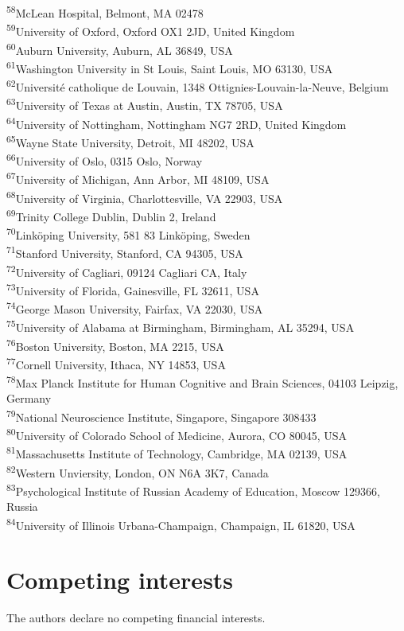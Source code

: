 \documentclass[fleqn,10pt,inline]{wlscirep}
\begin{document}
\textsuperscript{58}McLean Hospital, Belmont, MA 02478\\
\textsuperscript{59}University of Oxford, Oxford OX1 2JD, United Kingdom\\
\textsuperscript{60}Auburn University, Auburn, AL 36849, USA\\
\textsuperscript{61}Washington University in St Louis, Saint Louis, MO 63130, USA\\
\textsuperscript{62}Université catholique de Louvain, 1348 Ottignies-Louvain-la-Neuve, Belgium\\
\textsuperscript{63}University of Texas at Austin, Austin, TX 78705, USA\\
\textsuperscript{64}University of Nottingham, Nottingham NG7 2RD, United Kingdom\\
\textsuperscript{65}Wayne State University, Detroit, MI 48202, USA\\
\textsuperscript{66}University of Oslo, 0315 Oslo, Norway\\
\textsuperscript{67}University of Michigan, Ann Arbor, MI 48109, USA\\
\textsuperscript{68}University of Virginia, Charlottesville, VA 22903, USA\\
\textsuperscript{69}Trinity College Dublin, Dublin 2, Ireland\\
\textsuperscript{70}Linköping University, 581 83 Linköping, Sweden\\
\textsuperscript{71}Stanford University, Stanford, CA 94305, USA\\
\textsuperscript{72}University of Cagliari, 09124 Cagliari CA, Italy\\
\textsuperscript{73}University of Florida, Gainesville, FL 32611, USA\\
\textsuperscript{74}George Mason University, Fairfax, VA 22030, USA\\
\textsuperscript{75}University of Alabama at Birmingham, Birmingham, AL 35294, USA\\
\textsuperscript{76}Boston University, Boston, MA 2215, USA\\
\textsuperscript{77}Cornell University, Ithaca, NY 14853, USA\\
\textsuperscript{78}Max Planck Institute for Human Cognitive and Brain Sciences, 04103 Leipzig, Germany\\
\textsuperscript{79}National Neuroscience Institute, Singapore, Singapore 308433\\
\textsuperscript{80}University of Colorado School of Medicine, Aurora, CO 80045, USA\\
\textsuperscript{81}Massachusetts Institute of Technology, Cambridge, MA 02139, USA\\
\textsuperscript{82}Western Unviersity, London, ON N6A 3K7, Canada\\
\textsuperscript{83}Psychological Institute of Russian Academy of Education, Moscow 129366, Russia\\
\textsuperscript{84}University of Illinois Urbana-Champaign, Champaign, IL 61820, USA\\

\section*{Competing interests}

The authors declare no competing financial interests.
\end{document}
